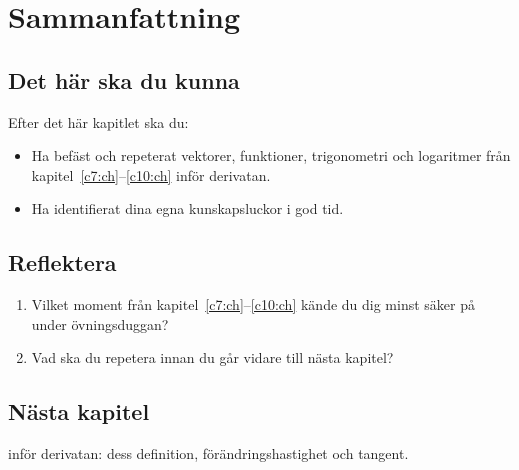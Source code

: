 
\section{Sammanfattning}
\label{c11:sec:sammanfattning}

\subsection*{Det här ska du kunna}
Efter det här kapitlet ska du:
\begin{itemize}
  \item Ha befäst och repeterat vektorer, funktioner, trigonometri och logaritmer från
    kapitel~\ref{c7:ch}--\ref{c10:ch} inför derivatan.
  \item Ha identifierat dina egna kunskapsluckor i god tid.
\end{itemize}

\subsection*{Reflektera}
\begin{enumerate}
  \item Vilket moment från kapitel~\ref{c7:ch}--\ref{c10:ch} kände du dig minst säker på under
    övningsduggan?
  \item Vad ska du repetera innan du går vidare till nästa kapitel?
\end{enumerate}

\subsection*{Nästa kapitel}
 inför derivatan: dess definition, förändringshastighet och tangent.
